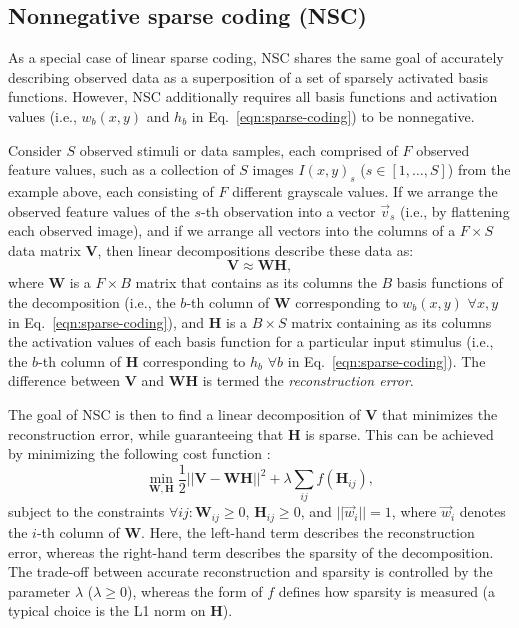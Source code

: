 \subsection*{Nonnegative sparse coding (NSC)}

As a special case of linear sparse coding,
\ac{NSC} shares the same goal of accurately describing observed data
as a superposition of a set of sparsely activated basis functions.
However, \ac{NSC} additionally requires 
all basis functions and activation values
(i.e., $w_b(x,y)$ and $h_b$ in Eq.~\ref{eqn:sparse-coding})
to be nonnegative.

Consider $S$ observed stimuli or data samples,
each comprised of $F$ observed feature values,
such as a collection of $S$ images $I(x,y)_s$ ($s \in [1, \ldots, S]$)
from the example above,
each consisting of $F$ different grayscale values.
If we arrange the observed feature values of the $s$-th observation into
a vector $\vec{v}_s$ (i.e., by flattening each observed image),
and if we arrange all vectors into the columns 
of a $F \times S$ data matrix \textbf{V},
then linear decompositions describe these data as:
\begin{equation}
\mathbf{V} \approx \mathbf{WH},
\label{eqn:linear-decomposition}
\end{equation}
where \textbf{W} is a $F \times B$ matrix that contains as its columns
the $B$ basis functions of the decomposition
(i.e., the $b$-th column of \textbf{W} corresponding to 
$w_b(x,y)$ $\forall x,y$ in Eq.~\ref{eqn:sparse-coding}),
and \textbf{H} is a $B \times S$ matrix containing
as its columns the activation values 
of each basis function for a particular input stimulus
(i.e., the $b$-th column of \textbf{H} corresponding to 
$h_b$ $\forall b$ in Eq.~\ref{eqn:sparse-coding}).
The difference between \textbf{V} and \textbf{WH} is termed
the \emph{reconstruction error}.

The goal of \ac{NSC} is then to find a linear decomposition of \textbf{V}
that minimizes the reconstruction error,
while guaranteeing that \textbf{H} is sparse.
This can be achieved by minimizing the following cost function
\cite{Hoyer2002}:
\begin{equation}
\min_{\mathbf{W}, \mathbf{H}} \frac{1}{2} ||\mathbf{V} -\mathbf{WH}||^2 + \lambda \sum_{ij} f(\mathbf{H}_{ij}),
\label{eqn:nsc-cost-function}
\end{equation}
subject to the constraints
$\forall ij: \mathbf{W}_{ij} \geq 0$, $\mathbf{H}_{ij} \geq 0$, and
$||\vec{w}_i|| = 1$, where $\vec{w}_i$ denotes the 
$i$-th column of \textbf{W}.
Here, the left-hand term describes the reconstruction error,
whereas the right-hand term describes the sparsity of the decomposition.
The trade-off between accurate reconstruction and sparsity
is controlled by the parameter $\lambda$ ($\lambda \geq 0$), whereas
the form of $f$ defines how sparsity is measured
(a typical choice is the L1 norm on \textbf{H}).

